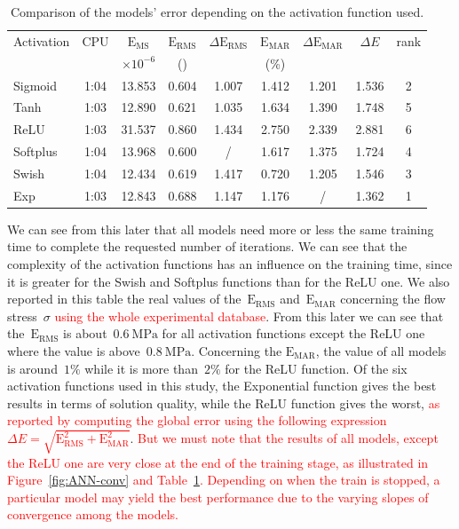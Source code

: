 \documentclass[algorithms,article,submit,pdftex,oneauthors]{Definitions/mdpi}
\DeclareRobustCommand{\MSE}{\text{E}_\text{MS}}
\DeclareRobustCommand{\RMSE}{\text{E}_\text{RMS}}
\DeclareRobustCommand{\MARE}{\text{E}_\text{MAR}}
\DeclareRobustCommand{\MPa}{\text{MPa}}
\begin{document}
\begin{table}[h!]
\caption{Comparison of the models' error depending on the activation function used.\label{tab:Training}}
\begin{tabular}{l|c|c|cc|cc|cc}
\toprule
Activation & CPU & $\MSE$ & $\RMSE$ & $\Delta\RMSE$ & $\MARE$ & $\Delta\MARE$ &  $\Delta E$ & rank \\
 & & $\times 10^{-6}$ & (\MPa) & & (\%) & & &\\ \midrule
Sigmoid & 1:04 & 13.853 & 0.604 & 1.007 & 1.412 & 1.201 & 1.536 & 2\\
Tanh & 1:03 & 12.890 & 0.621 & 1.035 & 1.634 & 1.390 & 1.748 & 5\\
ReLU & 1:03 & 31.537 & 0.860 & 1.434 & 2.750 & 2.339 & 2.881 & 6\\
Softplus & 1:04 & 13.968 & 0.600 & / & 1.617 & 1.375 & 1.724 & 4\\
Swish & 1:04 & 12.434 & 0.619 & 1.417 & 0.720 & 1.205 & 1.546 & 3\\
Exp & 1:03 & 12.843 & 0.688 & 1.147 & 1.176 & / & 1.362 & 1\\
\bottomrule
\end{tabular}
\end{table}

We can see from this later that all models need more or less the same training time to complete the requested number of iterations.
We can see that the complexity of the activation functions has an influence on the training time, since it is greater for the Swish and Softplus functions than for the ReLU one.
We also reported in this table the real values of the~$\RMSE$ and~$\MARE$ concerning the flow stress~$\sigma$ \textcolor{red}{using the whole experimental database}.
From this later we can see that the~$\RMSE$ is about~$0.6~\MPa$ for all activation functions except the ReLU one where the value is above~$0.8~\MPa$.
Concerning the $\MARE$, the value of all models is around~$1\%$ while it is more than~$2\%$ for the ReLU function.
Of the six activation functions used in this study, the Exponential function gives the best results in terms of solution quality, while the ReLU function gives the worst, \textcolor{red}{as reported by computing the global error using the following expression $\Delta E=\sqrt{\RMSE^2+\MARE^2}$}.
\textcolor{red}{But we must note that the results of all models, except the ReLU one are very close at the end of the training stage, as illustrated in Figure~\ref{fig:ANN-conv} and Table~\ref{tab:Training}.
Depending on when the train is stopped, a particular model may yield the best performance due to the varying slopes of convergence among the models.}
\end{document}
